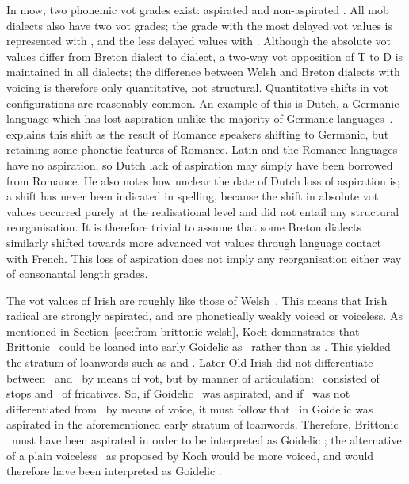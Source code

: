 In \gls{mow}, two phonemic \gls{vot} grades exist: aspirated  and non-aspirated . All \gls{mob} dialects also have two \gls{vot} grades; the grade with the most delayed \gls{vot} values is represented with , and the less delayed values with . Although the absolute \gls{vot} values differ from Breton dialect to dialect, a two-way \gls{vot} opposition of \gls{T} to \gls{D} is maintained in all dialects; the difference between Welsh and Breton dialects with voicing is therefore only quantitative, not structural. Quantitative shifts in \gls{vot} configurations are reasonably common. An example of this is Dutch, a Germanic language which has lost aspiration unlike the majority of Germanic languages~\autocite[82]{AW_VoiceOnset17}. \Textcite[122--123]{Sch_Language14} explains this shift as the result of Romance speakers shifting to Germanic, but retaining some phonetic features of Romance. Latin and the Romance languages have no aspiration, so Dutch lack of aspiration may simply have been borrowed from Romance. He also notes how unclear the date of Dutch loss of aspiration is; a shift has never been indicated in spelling, because the shift in absolute \gls{vot} values occurred purely at the realisational level and did not entail any structural reorganisation. It is therefore trivial to assume that some Breton dialects similarly shifted towards more advanced \gls{vot} values through language contact with French. This loss of aspiration does not imply any reorganisation either way of consonantal length grades.

The \gls{vot} values of Irish are roughly like those of Welsh~\autocite[85--86]{OD_Irish92}. This means that Irish radical  are strongly aspirated, and  are phonetically weakly voiced or voiceless. As mentioned in Section~\ref{sec:from-brittonic-welsh}, Koch demonstrates that Brittonic \lT\ could be loaned into early Goidelic as \lT\ rather than as \xD. This yielded the stratum of loanwords such as  and . Later Old Irish did not differentiate between \xT\ and \lT\ by means of \gls{vot}, but by manner of articulation: \xT\ consisted of stops and \lT\ of fricatives. So, if Goidelic \xT\ was aspirated, and if \lT\ was not differentiated from \xT\ by means of voice, it must follow that \lT\ in Goidelic was aspirated in the aforementioned early stratum of loanwords. Therefore, Brittonic \lT\ must have been aspirated in order to be interpreted as Goidelic \lT; the alternative of a plain voiceless \lT\ as proposed by Koch would be more voiced, and would therefore have been interpreted as Goidelic \xD. 

